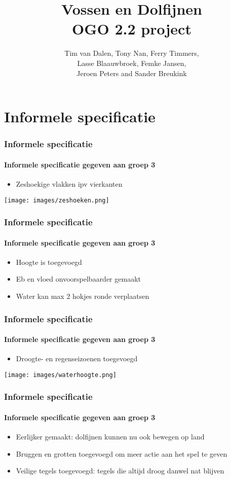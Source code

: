 \documentclass{beamer}
\title{Vossen en Dolfijnen\\\small OGO 2.2 project}
\author{Tim van Dalen, Tony Nan, Ferry Timmers,\\
                Lasse Blaauwbroek, Femke Jansen,\\
                Jeroen Peters and Sander Breukink\\}
\institute[TU/e]{}
\begin{document}
	\frame{\titlepage}
	
	\section{Informele specificatie}
	\begin{frame}
		\frametitle{Informele specificatie}
		\framesubtitle{Informele specificatie gegeven aan groep 3}
        	\begin{itemize}[<+->]
        		\item Zeshoekige vlakken ipv vierkanten
        	\end{itemize}
        	\texttt{[image: images/zeshoeken.png]}\\
	\end{frame}
	\begin{frame}
		\frametitle{Informele specificatie}
		\framesubtitle{Informele specificatie gegeven aan groep 3}
        	\begin{itemize}[<+->]
			\item Hoogte is toegevoegd
        		\item Eb en vloed onvoorspelbaarder gemaakt
        		\item Water kan max 2 hokjes ronde verplaatsen
        	\end{itemize}
	\end{frame}
	\begin{frame}
		\frametitle{Informele specificatie}
		\framesubtitle{Informele specificatie gegeven aan groep 3}
        	\begin{itemize}[<+->]
        		\item Droogte- en regenseizoenen toegevoegd
        	\end{itemize}
        	\texttt{[image: images/waterhoogte.png]}
	\end{frame}
	\begin{frame}
		\frametitle{Informele specificatie}
		\framesubtitle{Informele specificatie gegeven aan groep 3}
        	\begin{itemize}[<+->]
        		\item Eerlijker gemaakt: dolfijnen kunnen nu ook bewegen op land
        		\item Bruggen en grotten toegevoegd om meer actie aan het spel te geven
        		\item Veilige tegels toegevoegd: tegels die altijd droog danwel nat blijven
       		\end{itemize}
	\end{frame}

	\begin{frame}

	\end{frame}
\end{document}
